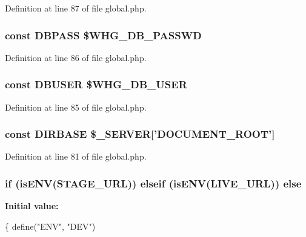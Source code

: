 Definition at line 87 of file global.\-php.

\hypertarget{global_8php_add7bef9fbed1ad1fa386dcb65fd5d813}{
\subsubsection[{D\-B\-P\-A\-S\-S}]{\setlength{\rightskip}{0pt plus 5cm}const D\-B\-P\-A\-S\-S \$W\-H\-G\-\_\-\-D\-B\-\_\-\-P\-A\-S\-S\-W\-D}}\label{global_8php_add7bef9fbed1ad1fa386dcb65fd5d813}


Definition at line 86 of file global.\-php.

\hypertarget{global_8php_a221f39b0b526c043e3a1ade2dd56a70e}{
\subsubsection[{D\-B\-U\-S\-E\-R}]{\setlength{\rightskip}{0pt plus 5cm}const D\-B\-U\-S\-E\-R \$W\-H\-G\-\_\-\-D\-B\-\_\-\-U\-S\-E\-R}}\label{global_8php_a221f39b0b526c043e3a1ade2dd56a70e}


Definition at line 85 of file global.\-php.

\hypertarget{global_8php_a504552fd43e46a0032aa3f2895349f22}{
\subsubsection[{D\-I\-R\-B\-A\-S\-E}]{\setlength{\rightskip}{0pt plus 5cm}const D\-I\-R\-B\-A\-S\-E \$\-\_\-\-S\-E\-R\-V\-E\-R\mbox{[}'D\-O\-C\-U\-M\-E\-N\-T\-\_\-\-R\-O\-O\-T'\mbox{]}}}\label{global_8php_a504552fd43e46a0032aa3f2895349f22}


Definition at line 81 of file global.\-php.

\hypertarget{global_8php_a84d6f541e8b918d4d74fe5a02b30588e}{
\subsubsection[{else}]{\setlength{\rightskip}{0pt plus 5cm}if ({\bf is\-E\-N\-V}({\bf S\-T\-A\-G\-E\-\_\-\-U\-R\-L})) elseif ({\bf is\-E\-N\-V}({\bf L\-I\-V\-E\-\_\-\-U\-R\-L})) else}}\label{global_8php_a84d6f541e8b918d4d74fe5a02b30588e}
{\bfseries Initial value\-:}
\begin{DoxyCode}
\{
        define(\textcolor{stringliteral}{"ENV"}, \textcolor{stringliteral}{"DEV"})
\end{DoxyCode}


